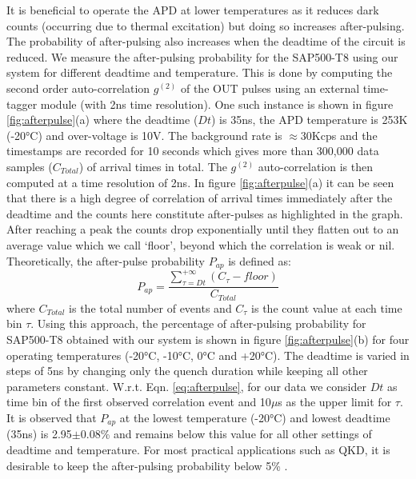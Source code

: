 It is beneficial to operate the APD at lower temperatures as it reduces dark counts (occurring due to thermal excitation) but doing so increases after-pulsing. The probability of after-pulsing also increases when the deadtime of the circuit is reduced. We measure the after-pulsing probability for the SAP500-T8 using our system for different deadtime and temperature. This is done by computing the second order auto-correlation $g^{(2)}$ of the OUT pulses using an external time-tagger module (with 2ns time resolution). One such instance is shown in figure \ref{fig:afterpulse}(a) where the deadtime ($Dt$) is 35ns, the APD temperature is 253K (-20°C) and over-voltage is 10V. The background rate is $\approx$30Kcps and the timestamps are recorded for 10 seconds which gives more than 300,000 data samples ($C_{Total}$) of arrival times in total. The $g^{(2)}$ auto-correlation is then computed at a time resolution of 2ns. In figure \ref{fig:afterpulse}(a) it can be seen that there is a high degree of correlation of arrival times immediately after the deadtime and the counts here constitute after-pulses as highlighted in the graph. After reaching a peak the counts drop exponentially until they flatten out to an average value which we call `floor', beyond which the correlation is weak or nil.
Theoretically, the after-pulse probability $P_{ap}$\cite{Ceccarelli2019} is defined as:
\begin{equation}
    P_{ap} = \frac{\sum_{\tau=Dt}^{+\infty}(C_{\tau}-floor)}{C_{Total}}
    \label{eq:afterpulse} 
\end{equation}
where $C_{Total}$ is the total number of events and $C_{\tau}$ is the count value at each time bin $\tau$. Using this approach, the percentage of after-pulsing probability for SAP500-T8 obtained with our system is shown in figure \ref{fig:afterpulse}(b) for four operating temperatures (-20°C, -10°C, 0°C and +20°C). The deadtime is varied in steps of 5ns by changing only the quench duration while keeping all other parameters constant. W.r.t. Eqn. \ref{eq:afterpulse}, for our data we consider $Dt$ as time bin of the first observed correlation event and 10$\mu$s as the upper limit for $\tau$. It is observed that $P_{ap}$ at the lowest temperature (-20°C) and lowest deadtime (35ns) is 2.95$\pm$0.08\% and remains below this value for all other settings of deadtime and temperature. For most practical applications such as QKD, it is desirable to keep the after-pulsing probability below 5\% \cite{Stipcevic17, Ceccarelli2019}.

